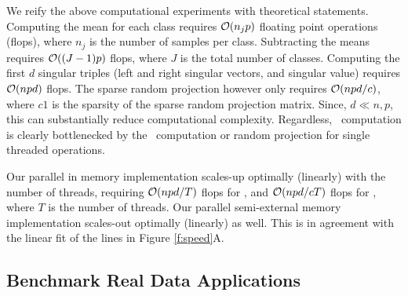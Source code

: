 \documentclass[10pt]{article}
\begin{document}

We reify the above computational experiments with theoretical statements.  Computing the mean for each class requires $\mathcal{O}(n_j p)$ floating point operations (flops), where $n_j$ is the number of samples per class. Subtracting the means requires $\mathcal{O}((J-1) p)$ flops, where $J$ is the total number of classes.  Computing the first $d$ singular triples (left and right singular vectors, and singular value) requires $\mathcal{O}(n p d)$ flops.
The sparse random projection however only requires $\mathcal{O}(n p d / c)$, where $c1$ is the sparsity of the sparse random projection matrix.
Since, $d \ll n,p$, this can substantially reduce computational complexity.  Regardless, \Lol~computation is clearly bottlenecked by the \Pca~computation or random projection for single threaded operations.

Our parallel in memory implementation scales-up optimally (linearly) with the number of threads, requiring $\mathcal{O}(n p d / T)$ flops for \Lol,
and $\mathcal{O}(n p d / c T)$ flops for \Lal,
where $T$ is the number of threads.  Our parallel semi-external memory implementation scales-out optimally (linearly) as well.  This is in agreement with the linear fit of the lines in Figure \ref{f:speed}A.





\subsection*{Benchmark Real Data Applications}
\end{document}
